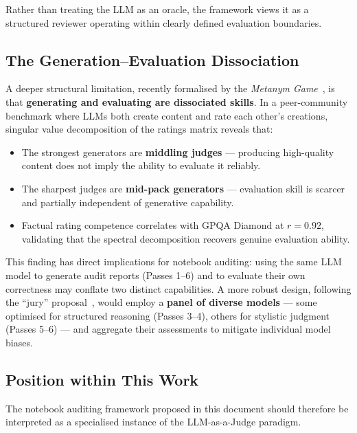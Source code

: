 \documentclass[11pt, a4paper]{article}
\begin{document}
Rather than treating the LLM as an oracle, the framework views it as a
structured reviewer operating within clearly defined evaluation boundaries.

\subsection*{The Generation--Evaluation Dissociation}

A deeper structural limitation, recently formalised by the \textit{Metanym
Game}~\cite{nordfors2026metanym}, is that \textbf{generating and evaluating
are dissociated skills}. In a peer-community benchmark where LLMs both create
content and rate each other's creations, singular value decomposition of the
ratings matrix reveals that:

\begin{itemize}
  \item The strongest generators are \textbf{middling judges} --- producing
    high-quality content does not imply the ability to evaluate it reliably.

  \item The sharpest judges are \textbf{mid-pack generators} --- evaluation
    skill is scarcer and partially independent of generative capability.

  \item Factual rating competence correlates with GPQA Diamond at $r = 0.92$,
    validating that the spectral decomposition recovers genuine evaluation
    ability.
\end{itemize}

This finding has direct implications for notebook auditing: using the same
LLM model to generate audit reports (Passes 1--6) and to evaluate their own
correctness may conflate two distinct capabilities. A more robust design,
following the ``jury'' proposal~\cite{verga2024juries}, would employ a
\textbf{panel of diverse models} --- some optimised for structured reasoning
(Passes 3--4), others for stylistic judgment (Passes 5--6) --- and aggregate
their assessments to mitigate individual model biases.

\subsection{Position within This Work}

The notebook auditing framework proposed in this document should therefore be
interpreted as a specialised instance of the LLM-as-a-Judge paradigm.
\end{document}
